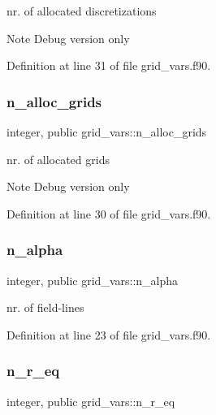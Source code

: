 nr. of allocated discretizations 

\begin{DoxyNote}{Note}
Debug version only 
\end{DoxyNote}


Definition at line 31 of file grid\+\_\+vars.\+f90.

\mbox{\label{namespacegrid__vars_ac4b43443d16af06fdc62d542b3eadee2}} 
\subsubsection{\texorpdfstring{n\+\_\+alloc\+\_\+grids}{n\_alloc\_grids}}
{\footnotesize\ttfamily integer, public grid\+\_\+vars\+::n\+\_\+alloc\+\_\+grids}



nr. of allocated grids 

\begin{DoxyNote}{Note}
Debug version only 
\end{DoxyNote}


Definition at line 30 of file grid\+\_\+vars.\+f90.

\mbox{\label{namespacegrid__vars_a83a6486b23c4a218822540da15904426}} 
\subsubsection{\texorpdfstring{n\+\_\+alpha}{n\_alpha}}
{\footnotesize\ttfamily integer, public grid\+\_\+vars\+::n\+\_\+alpha}



nr. of field-\/lines 



Definition at line 23 of file grid\+\_\+vars.\+f90.

\mbox{\label{namespacegrid__vars_aa3785d71892d3d7db81aca0b6aa880b0}} 
\subsubsection{\texorpdfstring{n\+\_\+r\+\_\+eq}{n\_r\_eq}}
{\footnotesize\ttfamily integer, public grid\+\_\+vars\+::n\+\_\+r\+\_\+eq}




